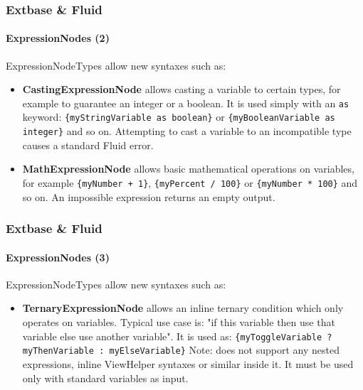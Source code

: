 \begin{frame}[fragile]
	\frametitle{Extbase \& Fluid}
	\framesubtitle{ExpressionNodes (2)}

	ExpressionNodeTypes allow new syntaxes such as:

	\begin{itemize}

		\item \textbf{CastingExpressionNode}\newline
			\small
				allows casting a variable to certain types, for example to guarantee
				an integer or a boolean. It is used simply with an \texttt{as} keyword:
				\texttt{\{myStringVariable as boolean\}} or
				\texttt{\{myBooleanVariable as integer\}} and so on.
				Attempting to cast a variable to an incompatible type causes a standard
				Fluid error.
			\normalsize

		\item \textbf{MathExpressionNode}\newline
			\small
				allows basic mathematical operations on variables, for example
				\texttt{\{myNumber + 1\}}, \texttt{\{myPercent / 100\}} or
				\texttt{\{myNumber * 100\}} and so on.
				An impossible expression returns an empty output.
			\normalsize

	\end{itemize}

\end{frame}


\begin{frame}[fragile]
	\frametitle{Extbase \& Fluid}
	\framesubtitle{ExpressionNodes (3)}

	ExpressionNodeTypes allow new syntaxes such as:

	\begin{itemize}

		\item \textbf{TernaryExpressionNode}\newline
			\small
				allows an inline ternary condition which only operates on variables.
				Typical use case is: "if this variable then use that variable else use
				another variable". It is used as:\newline
				\texttt{\{myToggleVariable ? myThenVariable : myElseVariable\}}\newline
				Note: does not support any nested expressions, inline ViewHelper
				syntaxes or similar inside it. It must be used only with standard
				variables as input.
			\normalsize

	\end{itemize}

\end{frame}

